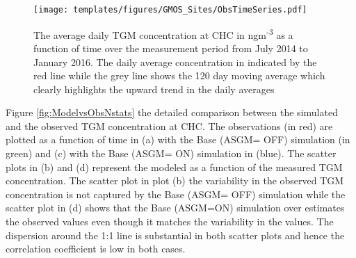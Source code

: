 \begin{figure}[H]
  \texttt{[image: templates/figures/GMOS\_Sites/ObsTimeSeries.pdf]}
 
  \caption{The average daily TGM concentration at CHC in ngm\textsuperscript{-3} as a function of time over the measurement period from July 2014 to January 2016. The daily average concentration in indicated by the red line while the grey line shows the 120 day moving average which clearly highlights the upward trend in the daily averages}
  \label{fig:ObsTseries}
  \centering
\end{figure}
\FloatBarrier

\begin{flushleft}
  Figure \ref{fig:ModelvsObsNstats} the detailed comparison between the simulated \hg  and the observed TGM concentration at CHC. The observations (in red) are plotted as a function of time in (a) with the Base (ASGM= OFF) simulation (in green) and (c) with the Base (ASGM= ON) simulation in (blue). The scatter plots in (b) and (d) represent the modeled \hg  as a function of the measured TGM concentration. The scatter plot in plot (b) the variability in the observed TGM concentration is not captured by the Base (ASGM= OFF) simulation while the scatter plot in (d) shows that the Base (ASGM=ON) simulation over estimates the observed values even though it matches the variability in the values. The dispersion around the 1:1 line is substantial in both scatter plots and hence the correlation coefficient is low in both cases. 
\end{flushleft}


